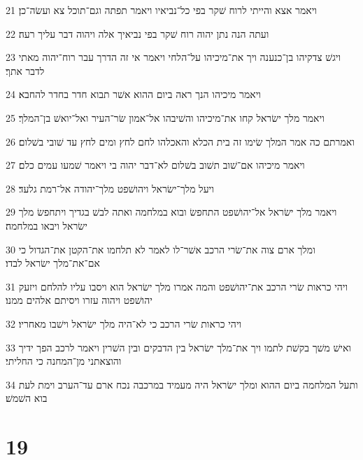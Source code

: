 \par 21 ויאמר אצא והייתי לרוח שׁקר בפי כל־נביאיו ויאמר תפתה וגם־תוכל צא ועשׂה־כן׃
\par 22 ועתה הנה נתן יהוה רוח שׁקר בפי נביאיך אלה ויהוה דבר עליך רעה׃
\par 23 ויגשׁ צדקיהו בן־כנענה ויך את־מיכיהו על־הלחי ויאמר אי זה הדרך עבר רוח־יהוה מאתי לדבר אתך׃
\par 24 ויאמר מיכיהו הנך ראה ביום ההוא אשׁר תבוא חדר בחדר להחבא׃
\par 25 ויאמר מלך ישׂראל קחו את־מיכיהו והשׁיבהו אל־אמון שׂר־העיר ואל־יואשׁ בן־המלך׃
\par 26 ואמרתם כה אמר המלך שׂימו זה בית הכלא והאכלהו לחם לחץ ומים לחץ עד שׁובי בשׁלום׃
\par 27 ויאמר מיכיהו אם־שׁוב תשׁוב בשׁלום לא־דבר יהוה בי ויאמר שׁמעו עמים כלם׃
\par 28 ויעל מלך־ישׂראל ויהושׁפט מלך־יהודה אל־רמת גלעד׃
\par 29 ויאמר מלך ישׂראל אל־יהושׁפט התחפשׂ ובוא במלחמה ואתה לבשׁ בגדיך ויתחפשׂ מלך ישׂראל ויבאו במלחמה׃
\par 30 ומלך ארם צוה את־שׂרי הרכב אשׁר־לו לאמר לא תלחמו את־הקטן את־הגדול כי אם־את־מלך ישׂראל לבדו׃
\par 31 ויהי כראות שׂרי הרכב את־יהושׁפט והמה אמרו מלך ישׂראל הוא ויסבו עליו להלחם ויזעק יהושׁפט ויהוה עזרו ויסיתם אלהים ממנו׃
\par 32 ויהי כראות שׂרי הרכב כי לא־היה מלך ישׂראל וישׁבו מאחריו׃
\par 33 ואישׁ משׁך בקשׁת לתמו ויך את־מלך ישׂראל בין הדבקים ובין השׁרין ויאמר לרכב הפך ידיך והוצאתני מן־המחנה כי החליתי׃
\par 34 ותעל המלחמה ביום ההוא ומלך ישׂראל היה מעמיד במרכבה נכח ארם עד־הערב וימת לעת בוא השׁמשׁ׃

\chapter{19}

